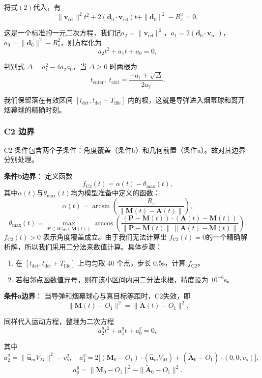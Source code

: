 \documentclass{ctexart}
\begin{document}
将式$(2)$代入，有
\[
\|\mathbf{v}_{\text{rel}}\|^2 t^2 + 2(\mathbf{d}_0\cdot\mathbf{v}_{\text{rel}}) t +  \|\mathbf{d}_0\|^2 - R_s^2 = 0,
\]

这是一个标准的一元二次方程，我们记$a_2 = \|\mathbf{v}_{\text{rel}}\|^2$，$a_1 = 2(\mathbf{d}_0\cdot\mathbf{v}_{\text{rel}})$，$a_0 = \|\mathbf{d}_0\|^2 - R_s^2$，则方程化为
\[
a_2 t^2 + a_1 t + a_0 = 0,
\]

判别式 $\Delta = a_1^2 - 4a_2a_0$，当 $\Delta\ge 0$ 时两根为
\[
t_{\text{enter}},\;t_{\text{exit}} = \frac{-a_1 \mp \sqrt{\Delta}}{2a_2}.
\]

我们保留落在有效区间 $[t_{\text{det}}, t_{\text{det}}+T_{\text{life}}]$ 内的根，这就是导弹进入烟幕球和离开烟幕球的精确时刻。

\subsubsection{C2 边界}
C2 条件包含两个子条件：角度覆盖（条件b）和几何前置（条件a）。故对其边界分别处理。

\textbf{条件b边界}：
定义函数
\[
f_{\text{C2}}(t) = \alpha(t) - \theta_{\max}(t),
\]
其中$\alpha(t)$与$\theta_{\max}(t)$均为模型准备中定义的函数：
\[
\alpha(t)=\arcsin\!\left(\frac{R_s}{\|\mathbf{M}(t)-\mathbf{A}(t)\|}\right),
\]
\[
\theta_{\max}(t)=\max_{\mathbf{P}\in\partial\mathcal{C}_{\text{vis}}(\mathbf{M}(t))}
\arccos\!\left(
\frac{(\mathbf{P}-\mathbf{M}(t))\cdot(\mathbf{A}(t)-\mathbf{M}(t))}
{\|\mathbf{P}-\mathbf{M}(t)\|\,\|\mathbf{A}(t)-\mathbf{M}(t)\|}
\right).
\]
$f_{\text{C2}}(t)>0$ 表示角度覆盖成立。由于我们无法计算出 $f_{\text{C2}}(t)=0$的一个精确解析解，所以我们采用二分法来数值计算。具体步骤：
\begin{enumerate}
    \item 在 $[t_{\text{det}}, t_{\text{det}}+T_{\text{life}}]$ 上均匀取 40 个点，步长 $0.5\mathrm{s}$，计算 $f_{\text{C2}}$。
    \item 若相邻点函数值异号，则在该小区间内用二分法求根，精度设为 $10^{-6}\mathrm{s}$。
\end{enumerate}

\textbf{条件a边界}：
当导弹和烟幕球心与真目标等距时，C2失效，即
\[
\|\mathbf{M}(t)-O_1\|^2 = \|\mathbf{A}(t)-O_1\|^2.
\]

同样代入运动方程，整理为二次方程
\[
a_2^g t^2 + a_1^g t + a_0^g = 0,
\]

其中
\[
a_2^g = \|\hat{\mathbf{u}}_m V_M\|^2 - v_s^2,\quad
a_1^g = 2\big[(\mathbf{M}_0-O_1)\cdot(\hat{\mathbf{u}}_m V_M) + (\tilde{\mathbf{A}}_0-O_1)\cdot(0,0,v_s)\big],
\]
\[
a_0^g = \|\mathbf{M}_0-O_1\|^2 - \|\tilde{\mathbf{A}}_0-O_1\|^2.
\]
\end{document}
